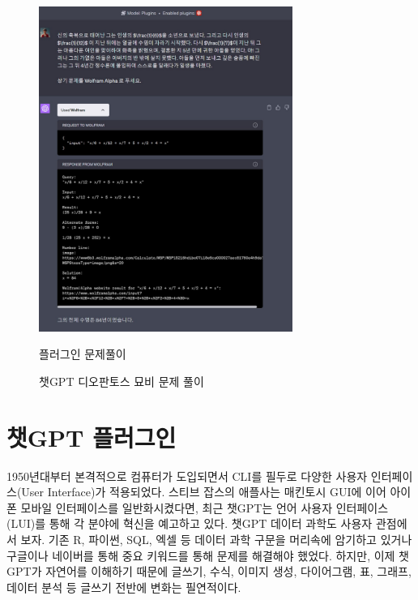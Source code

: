 \documentclass[
  letterpaper,
]{book}
\begin{document}
\begin{figure}
\begin{minipage}[t]{0.50\linewidth}
{{\includegraphics[width=3.26042in,height=\textheight]{images/wolfram_alpha.jpg}

}

\caption{플러그인 문제풀이}

}

\end{minipage}%

\caption{\label{fig-math}챗GPT 디오판토스 묘비 문제 풀이}

\end{figure}

\hypertarget{uxcc57gpt-uxd50cuxb7ecuxadf8uxc778}{%
\chapter{챗GPT 플러그인}\label{uxcc57gpt-uxd50cuxb7ecuxadf8uxc778}}

1950년대부터 본격적으로 컴퓨터가 도입되면서 CLI를 필두로 다양한 사용자
인터페이스(User Interface)가 적용되었다. 스티브 잡스의 애플사는 매킨토시
GUI에 이어 아이폰 모바일 인터페이스를 일반화시켰다면, 최근 챗GPT는 언어
사용자 인터페이스(LUI)를 통해 각 분야에 혁신을 예고하고 있다. 챗GPT
데이터 과학도 사용자 관점에서 보자. 기존 R, 파이썬, SQL, 엑셀 등 데이터
과학 구문을 머리속에 암기하고 있거나 구글이나 네이버를 통해 중요
키워드를 통해 문제를 해결해야 했었다. 하지만, 이제 챗GPT가 자연어를
이해하기 때문에 글쓰기, 수식, 이미지 생성, 다이어그램, 표, 그래프,
데이터 분석 등 글쓰기 전반에 변화는
필연적이다.
\autocite{wickham2023r} \autocite{wickham2019welcome}
\autocite{gozalo2023chatgpt}
\end{document}
